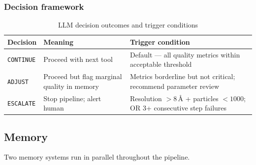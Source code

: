 \documentclass[12pt, a4paper]{article}
\begin{document}
\subsubsection{Decision framework}

\begin{table}[H]
\centering
\caption{LLM decision outcomes and trigger conditions}
\label{tab:decisions}
\renewcommand{\arraystretch}{1.3}
\begin{tabular}{l p{5.0cm} p{6.2cm}}
\toprule
\textbf{Decision} & \textbf{Meaning} & \textbf{Trigger condition} \\
\midrule
\texttt{CONTINUE}
  & Proceed with next tool
  & Default --- all quality metrics within acceptable threshold \\
\texttt{ADJUST}
  & Proceed but flag marginal quality in memory
  & Metrics borderline but not critical; recommend parameter review \\
\texttt{ESCALATE}
  & Stop pipeline; alert human
  & Resolution $>8$\,\AA{} + particles $<1000$; OR 3+ consecutive
    step failures \\
\bottomrule
\end{tabular}
\end{table}

\subsection{Memory}

Two memory systems run in parallel throughout the pipeline.
\end{document}
